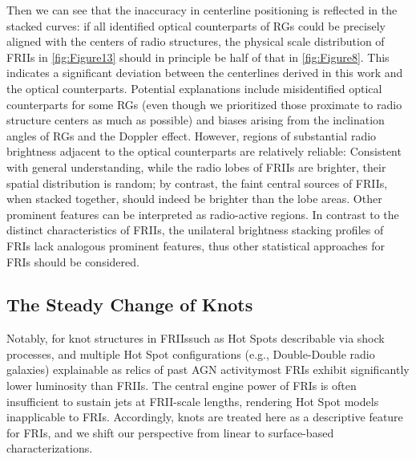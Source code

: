 \documentclass{aa}
\begin{document}
Then we can see that the inaccuracy in centerline positioning is reflected in the stacked curves: if all identified optical counterparts of RGs could be precisely aligned with the centers of radio structures, the physical scale distribution of FRIIs in \autoref{fig:Figure13} should in principle be half of that in \autoref{fig:Figure8}. This indicates a significant deviation between the centerlines derived in this work and the optical counterparts. Potential explanations include misidentified optical counterparts for some RGs (even though we prioritized those proximate to radio structure centers as much as possible) and biases arising from the inclination angles of RGs and the Doppler effect. However, regions of substantial radio brightness adjacent to the optical counterparts are relatively reliable: Consistent with general understanding, while the radio lobes of FRIIs are brighter, their spatial distribution is random; by contrast, the faint central sources of FRIIs, when stacked together, should indeed be brighter than the lobe areas. Other prominent features can be interpreted as radio-active regions. In contrast to the distinct characteristics of FRIIs, the unilateral brightness stacking profiles of FRIs lack analogous prominent features, thus other statistical approaches for FRIs should be considered.


\subsection{The Steady Change of Knots}\label{sec:Section5_4}

Notably, for knot structures in FRIIs\textemdash such as Hot Spots describable via shock processes, and multiple Hot Spot configurations  (e.g., Double-Double radio galaxies) explainable as relics of past AGN activity\textemdash most FRIs exhibit significantly lower luminosity than FRIIs. The central engine power of FRIs is often insufficient to sustain jets at FRII-scale lengths, rendering Hot Spot models inapplicable to FRIs. Accordingly, knots are treated here as a descriptive feature for FRIs, and we shift our perspective from linear to surface-based characterizations.
\end{document}
